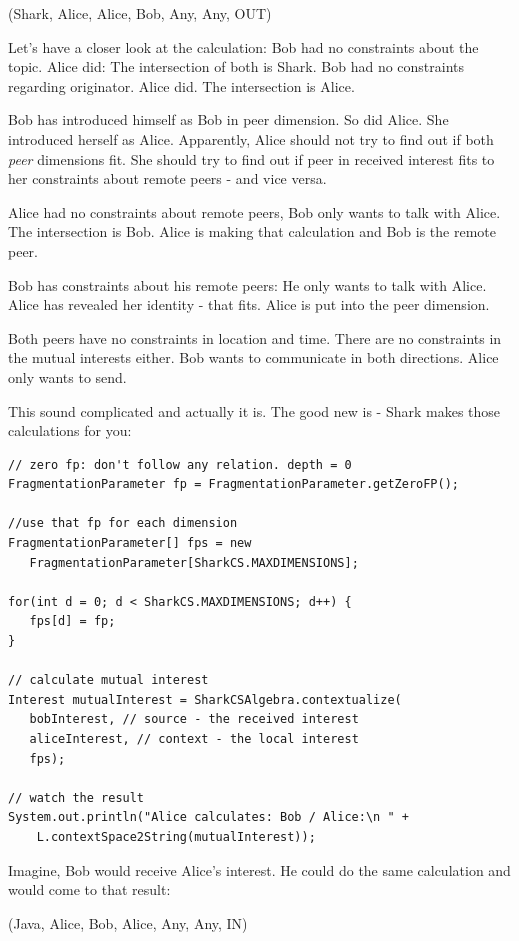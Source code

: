 (Shark, Alice, Alice, Bob, Any, Any, OUT)

Let's have a closer look at the calculation: Bob had no constraints about the topic. Alice did: The intersection of both is Shark. Bob had no constraints regarding originator. Alice did. The intersection is Alice.

Bob has introduced himself as Bob in peer dimension. So did Alice. She introduced herself as Alice. Apparently, Alice should not try to find out if both  {\it peer} dimensions fit. She should try to find out if peer in received interest fits to her constraints about remote peers - and vice versa.

Alice had no constraints about remote peers, Bob only wants to talk with Alice. The intersection is Bob. Alice is making that calculation and Bob is the remote peer.

Bob has constraints about his remote peers: He only wants to talk with Alice. Alice has revealed her identity - that fits. Alice is put into the peer dimension.

Both peers have no constraints in location and time. There are no constraints in the mutual interests either. Bob wants to communicate in both directions. Alice only wants to send.

This sound complicated and actually it is. The good new is - Shark makes those calculations for you:

\begin{verbatim}
// zero fp: don't follow any relation. depth = 0
FragmentationParameter fp = FragmentationParameter.getZeroFP();

//use that fp for each dimension
FragmentationParameter[] fps = new
   FragmentationParameter[SharkCS.MAXDIMENSIONS];

for(int d = 0; d < SharkCS.MAXDIMENSIONS; d++) {
   fps[d] = fp;
}

// calculate mutual interest
Interest mutualInterest = SharkCSAlgebra.contextualize(
   bobInterest, // source - the received interest
   aliceInterest, // context - the local interest
   fps);

// watch the result
System.out.println("Alice calculates: Bob / Alice:\n " +
    L.contextSpace2String(mutualInterest));

\end{verbatim}

Imagine, Bob would receive Alice's interest. He could do the same calculation and would come to that result:

(Java, Alice, Bob, Alice, Any, Any, IN)

